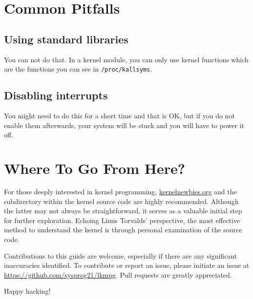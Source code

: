 \documentclass[10pt, oneside]{book}
\begin{document}
\section{Common Pitfalls}
\label{sec:opitfall}

\subsection{Using standard libraries}
\label{sec:using_stdlib}
You can not do that.
In a kernel module, you can only use kernel functions which are the functions you can see in \verb|/proc/kallsyms|.

\subsection{Disabling interrupts}
\label{sec:disabling_interrupts}
You might need to do this for a short time and that is OK, but if you do not enable them afterwards, your system will be stuck and you will have to power it off.

\section{Where To Go From Here?}
\label{sec:where_to_go}
For those deeply interested in kernel programming,
\href{https://kernelnewbies.org}{kernelnewbies.org} and the  subdirectory within the kernel source code are highly recommended.
Although the latter may not always be straightforward, it serves as a valuable initial step for further exploration.
Echoing Linus Torvalds' perspective, the most effective method to understand the kernel is through personal examination of the source code.

Contributions to this guide are welcome, especially if there are any significant inaccuracies identified.
To contribute or report an issue, please initiate an issue at \url{https://github.com/sysprog21/lkmpg}.
Pull requests are greatly appreciated.

Happy hacking!
\end{document}
